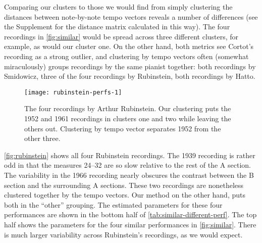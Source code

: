 \documentclass[12pt]{article}
\begin{document}
Comparing our clusters to those we would find from simply clustering
the distances between note-by-note tempo vectors reveals a number of
differences (see the Supplement for the distance matrix calculated in
this way). The four recordings in \autoref{fig:similar} would be
spread across three different clusters, for example, as would our
cluster one. On the other hand, both metrics see Cortot's recording as a
strong outlier, and clustering by tempo vectors often (somewhat
miraculously) groups recordings by the same pianist together: both
recordings by Smidowicz, three of the four recordings by Rubinstein,
both recordings by Hatto.
\begin{figure}[t]
  \centering
  \texttt{[image: rubinstein-perfs-1]}
  \caption{The four recordings by Arthur Rubinstein. Our clustering
    puts the 1952 and 1961 recordings in clusters one and two while
    leaving the others out. Clustering by tempo vector separates 1952
    from the other three.}
  \label{fig:rubinstein}
\end{figure}
\autoref{fig:rubinstein} shows all four Rubinstein recordings. The
1939 recording is rather odd in that the measures 24--32 are so slow
relative to the rest of the A section. The variability in the 1966
recording nearly obscures the contrast between the B section and the
surrounding A sections. These two recordings are nonetheless clustered
together by the tempo vectors. Our method on the other hand, puts both
in the ``other'' grouping. The estimated parameters for these four
performances are shown in the bottom half of
\autoref{tab:similar-different-perf}. The top half shows the
parameters for the four similar performances in
\autoref{fig:similar}. There is much larger variability across
Rubinstein's recordings, as we would expect.
\end{document}

